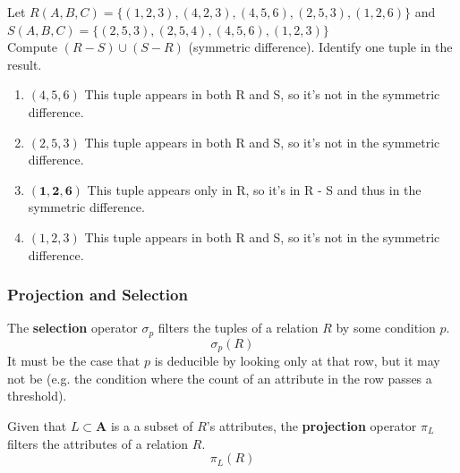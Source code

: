     \begin{example}
      Let $R(A,B,C) = \{(1,2,3), (4,2,3), (4,5,6), (2,5,3), (1,2,6)\}$ and\\
      $S(A,B,C) = \{(2,5,3), (2,5,4), (4,5,6), (1,2,3)\}$\\
      Compute $(R - S) \cup (S - R)$ (symmetric difference). Identify one tuple in the result.

      \begin{enumerate}
        \item $(4,5,6)$ This tuple appears in both R and S, so it's not in the symmetric difference.
        
        \item $(2,5,3)$ This tuple appears in both R and S, so it's not in the symmetric difference.
        
        \item $\mathbf{(1,2,6)}$ This tuple appears only in R, so it's in R - S and thus in the symmetric difference.
        
        \item $(1,2,3)$ This tuple appears in both R and S, so it's not in the symmetric difference.
      \end{enumerate}
    \end{example}

  \subsubsection{Projection and Selection}

    \begin{definition}[Selection]
      The \textbf{selection} operator $\sigma_p$ filters the tuples of a relation $R$ by some condition $p$. 
      \begin{equation}
        \sigma_p (R)
      \end{equation}
      It must be the case that $p$ is deducible by looking only at that row, but it may not be (e.g. the condition where the count of an attribute in the row passes a threshold). 
    \end{definition}

    \begin{definition}[Projection]
      Given that $L \subset \mathbf{A}$ is a a subset of $R$'s attributes, the \textbf{projection} operator $\pi_L$ filters the attributes of a relation $R$. 
      \begin{equation}
        \pi_L (R)
      \end{equation}
    \end{definition}

